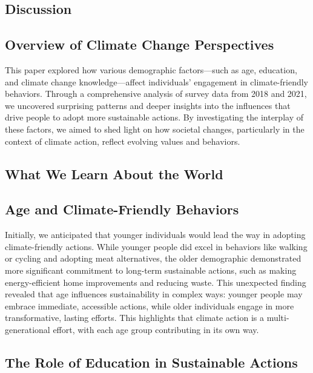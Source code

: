 \documentclass[
  letterpaper,
  DIV=11,
  numbers=noendperiod]{scrartcl}
\begin{document}
\subsection{Discussion}\label{sec-discussion}

\subsection{Overview of Climate Change
Perspectives}\label{overview-of-climate-change-perspectives}

This paper explored how various demographic factors---such as age,
education, and climate change knowledge---affect individuals' engagement
in climate-friendly behaviors. Through a comprehensive analysis of
survey data from 2018 and 2021, we uncovered surprising patterns and
deeper insights into the influences that drive people to adopt more
sustainable actions. By investigating the interplay of these factors, we
aimed to shed light on how societal changes, particularly in the context
of climate action, reflect evolving values and behaviors.

\subsection{What We Learn About the
World}\label{what-we-learn-about-the-world}

\subsection{Age and Climate-Friendly Behaviors}\label{sec-first-point}

Initially, we anticipated that younger individuals would lead the way in
adopting climate-friendly actions. While younger people did excel in
behaviors like walking or cycling and adopting meat alternatives, the
older demographic demonstrated more significant commitment to long-term
sustainable actions, such as making energy-efficient home improvements
and reducing waste. This unexpected finding revealed that age influences
sustainability in complex ways: younger people may embrace immediate,
accessible actions, while older individuals engage in more
transformative, lasting efforts. This highlights that climate action is
a multi-generational effort, with each age group contributing in its own
way.

\subsection{The Role of Education in Sustainable
Actions}\label{sec-second-point}
\end{document}
